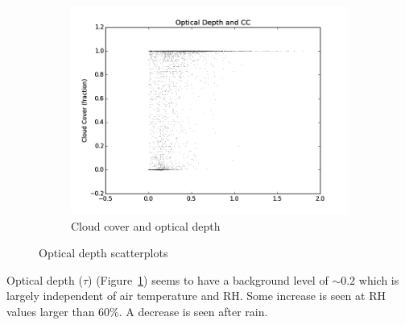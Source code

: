 \documentclass[a4paper,titlepage, twoside]{report}
\begin{document}
\begin{figure}
\begin{subfigure}{0.48\textwidth}
\includegraphics[width=\textwidth]{025_tau_CC.png}
\caption{Cloud cover and optical depth}
\end{subfigure}
\caption{Optical depth scatterplots}
\label{fig:data-5}
\end{figure}

Optical depth ($\tau$) (Figure~\ref{fig:data-5}) seems to have a background level of $\sim 0.2$ which is largely independent of air temperature and RH. Some increase is seen at RH values larger than 60\%. A decrease is seen after rain.
\end{document}
